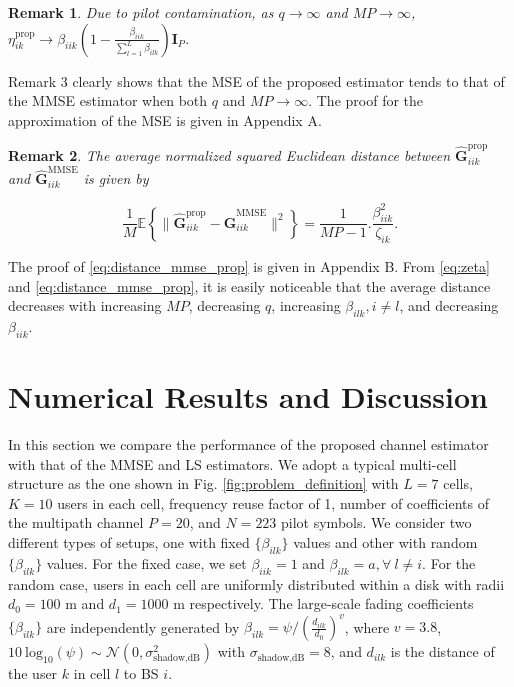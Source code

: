 \documentclass[journal,12pt,onecolumn]{IEEEtran}
\newtheorem{remark}{Remark}
\begin{document}
\begin{remark} Due to pilot contamination, as $q \to\infty$ and $MP \to\infty$, $\eta_{ik}^{\text{prop}} \to \beta_{iik} \left( 1 - \frac{\beta_{iik}}{\sum_{l=1}^{L}{\beta_{ilk}}} \right) \textbf{I}_{P}$. \end{remark}

Remark 3 clearly shows that the MSE of the proposed estimator tends to that of the MMSE estimator when both $q$ and $MP \to\infty$. The proof for the approximation of the MSE is given in Appendix A.

\begin{remark} The average normalized squared Euclidean distance between $\hat{\textbf{G}}_{iik}^{\text{prop}}$ and $\hat{\textbf{G}}_{iik}^{\text{MMSE}}$ is given by \end{remark}
\begin{equation}\label{eq:distance_mmse_prop}
\frac{1}{M} \mathbb{E} \left\lbrace \lVert  \hat{\textbf{G}}_{iik}^{\text{prop}} - \hat{\textbf{G}}_{iik}^{\text{MMSE}} \rVert^{2} \right\rbrace = \frac{1}{MP-1} . \frac{\beta_{iik}^{2}}{\zeta_{ik}}.
\end{equation}

The proof of \eqref{eq:distance_mmse_prop} is given in Appendix B. From \eqref{eq:zeta} and \eqref{eq:distance_mmse_prop}, it is easily noticeable that the average distance decreases with increasing $MP$, decreasing $q$, increasing $\beta_{ilk}, i \neq l$, and decreasing $\beta_{iik}$.

\section{Numerical Results and Discussion}

In this section we compare the performance of the proposed channel estimator with that of the MMSE and LS estimators. We adopt a typical multi-cell structure as the one shown in Fig. \ref{fig:problem_definition} with $L = 7$ cells, $K = 10$ users in each cell, frequency reuse factor of 1, number of coefficients of the multipath channel $P = 20$, and $N = 223$ pilot symbols. We consider two different types of setups, one with fixed $\{\beta_{ilk}\}$ values and other with random $\{\beta_{ilk}\}$ values. For the fixed case, we set $\beta_{iik} = 1$ and $\beta_{ilk} = a,  \forall \  l \neq i$. For the random case, users in each cell are uniformly distributed within a disk with radii $d_{0} = 100$ m and $d_{1} = 1000$ m respectively. The large-scale fading coefficients $\{\beta_{ilk}\}$ are independently generated by $\beta_{ilk} = \psi / \left( \frac{d_{ilk}}{d_{0}}\right)^{v}$, where $v = 3.8$, $10 \ \text{log}_{10}(\psi) \sim \mathcal{N}(0,\sigma_{\text{shadow,dB}}^{2})$ with $\sigma_{\text{shadow,dB}} = 8$, and $d_{ilk}$ is the distance of the user $k$ in cell $l$ to BS $i$.
\end{document}
